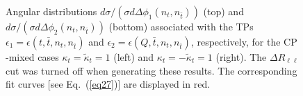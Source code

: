 \documentclass[aps,preprint,tightenlines,floatfix,superscriptaddress,nofootinbib,showpacs]{revtex4-1}
\def\tbar{\bar{t}}
\def\kp{\kappa_t}
\def\kpt{\tilde{\kappa}_t}
\def\TPa{\epsilon(t,\tbar,n_t,n_{\tbar})}
\def\TPb{\epsilon(Q,\tbar,n_t,n_{\tbar})}
\begin{document}
\begin{center}
\begin{figure}[H]
\hspace*{-0.006\textwidth}
\caption{Angular distributions $d\sigma/(\sigma
  d\Delta\phi_1(n_t,n_{\tbar}))$ (top) and $d\sigma/(\sigma
  d\Delta\phi_2(n_t,n_{\tbar}))$ (bottom) associated with the TPs
  $\epsilon_1=\TPa$ and $\epsilon_2=\TPb$, respectively, for the
  $\mathrm{CP}$-mixed cases $\kp=\kpt=1$ (left) and $\kp=-\kpt=1$
  (right).  The $\Delta R_{\ell\ell}$ cut was turned off when
  generating these results. The
  corresponding fit curves [see Eq.~(\ref{eq27})] are displayed in red.}
\label{fig7}
\end{figure}
\end{center}
\par
\end{document}
